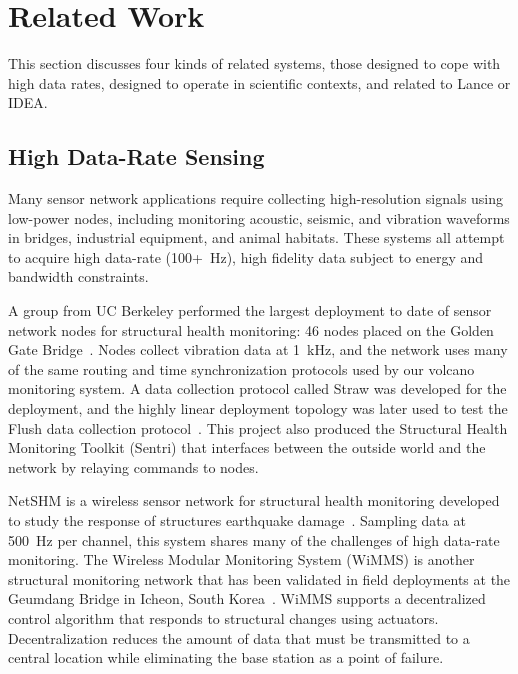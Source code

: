 \section{Related Work}
\label{sec-relatedwork}

This section discusses four kinds of related systems, those designed to cope
with high data rates, designed to operate in scientific contexts, and related
to Lance or IDEA.

\subsection{High Data-Rate Sensing}

Many sensor network applications require collecting high-resolution signals
using low-power nodes, including monitoring acoustic, seismic, and vibration
waveforms in bridges, industrial equipment, and animal habitats. These
systems all attempt to acquire high data-rate (100+~Hz), high fidelity data
subject to energy and bandwidth constraints.

A group from UC Berkeley performed the largest deployment to date of sensor
network nodes for structural health monitoring: 46 nodes placed on the Golden
Gate Bridge~\cite{ggb-ipsn07}. Nodes collect vibration data at 1~kHz, and the
network uses many of the same routing and time synchronization protocols used
by our volcano monitoring system. A data collection protocol called Straw was
developed for the deployment, and the highly linear deployment topology was
later used to test the Flush data collection protocol~\cite{flush-sensys07}.
This project also produced the Structural Health Monitoring Toolkit (Sentri)
that interfaces between the outside world and the network by relaying
commands to nodes.

NetSHM is a wireless sensor network for structural health monitoring
developed to study the response of structures earthquake
damage~\cite{netshm-ewsnsubmission,netshm-emnets05,wisan}. Sampling data at
500~Hz per channel, this system shares many of the challenges of high
data-rate monitoring. The Wireless Modular Monitoring System (WiMMS) is
another structural monitoring network that has been validated in field
deployments at the Geumdang Bridge in Icheon, South
Korea~\cite{wimms-lynch06}. WiMMS supports a decentralized control algorithm
that responds to structural changes using actuators. Decentralization reduces
the amount of data that must be transmitted to a central location while
eliminating the base station as a point of failure.

